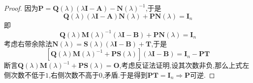 {\begin{proof}
        因为$\bm{P}=
            \bm{Q}\left(\lambda\right)\left(\lambda\bm{I}-\bm{A}\right)-\bm{N}\left(\lambda\right)^{-1}
        $,于是
        \[
            \bm{Q}\left(\lambda\right)\left(\lambda\bm{I}-\bm{A}\right)\bm{N}\left(\lambda\right)+\bm{P}\bm{N}\left(\lambda\right)=\bm{I}_n
        \]即
        \[
            \bm{Q}\left(\lambda\right)\bm{M}\left(\lambda\right)^{-1}\left(\lambda\bm{I}-\bm{B}\right)+\bm{P}\bm{N}\left(\lambda\right)=\bm{I}_n
        \]考虑右带余除法$\bm{N}\left(\lambda\right)=\bm{S}\left(\lambda\right)\left(\lambda\bm{I}-\bm{B}\right)+\bm{T}$,于是
        \[
            \left[
                \bm{Q}\left(\lambda\right)\bm{M}\left(\lambda\right)^{-1}+\bm{PS}\left(\lambda\right)
                \right]\left(\lambda\bm{I}-\bm{B}\right)=\bm{I}_n-\bm{PT}
        \]断言$\bm{Q}\left(\lambda\right)\bm{M}\left(\lambda\right)^{-1}+\bm{PS}\left(\lambda\right)=\bm{O}$,考虑反证法证明,设其次数非负,那么上式左侧次数不低于$1$,右侧次数不高于$0$,矛盾.于是得到$\bm{PT}=\bm{I}_n\Longrightarrow \bm{P}$可逆.
    \end{proof}
}